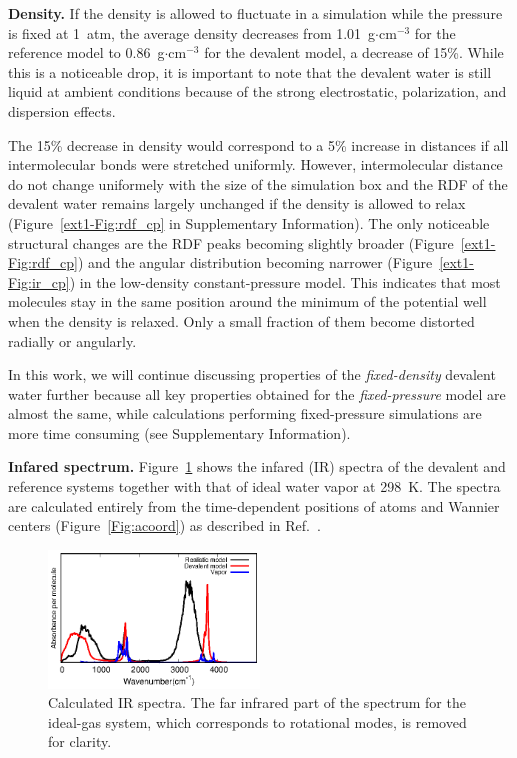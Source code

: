 \documentclass[journal=jacsat,manuscript=article]{achemso}
\begin{document}
\textbf{Density.} If the density is allowed to fluctuate in a simulation while the pressure is fixed at 1~atm, the average density decreases from 1.01~g$\cdot$cm$^{-3}$ for the reference model to 0.86~g$\cdot$cm$^{-3}$ for the devalent model, a decrease of 15\%. 
While this is a noticeable drop, it is important to note that the devalent water is still liquid at ambient conditions because of the strong electrostatic, polarization, and dispersion effects. 

The 15\% decrease in density would correspond to a 5\% increase in distances if all intermolecular bonds were stretched uniformly. 
However, intermolecular distance do not change uniformely with the size of the simulation box and the RDF of the devalent water remains largely unchanged if the density is allowed to relax (Figure~\ref{ext1-Fig:rdf_cp} in Supplementary Information). 
The only noticeable structural changes are the RDF peaks becoming slightly broader (Figure~\ref{ext1-Fig:rdf_cp}) and the angular distribution becoming narrower (Figure~\ref{ext1-Fig:ir_cp}) in the low-density constant-pressure model. 
This indicates that most molecules stay in the same position around the minimum of the potential well when the density is relaxed. 
Only a small fraction of them become distorted radially or angularly. 

In this work, we will continue discussing properties of the \emph{fixed-density} devalent water further because all key properties obtained for the \emph{fixed-pressure} model are almost the same, while calculations performing fixed-pressure simulations are more time consuming (see Supplementary Information).


\textbf{Infared spectrum.} Figure~\ref{Fig:IR} shows the infared (IR) spectra of the devalent and reference systems together with that of ideal water vapor at 298~K. The spectra are calculated entirely from the time-dependent positions of atoms and Wannier centers (Figure~\ref{Fig:acoord}) as described in Ref.~.

\begin{figure}
\centering
\includegraphics[width=0.5\textwidth]{new_ir}
\caption{Calculated IR spectra. The far infrared part of the spectrum for the ideal-gas system, which corresponds to rotational modes, is removed for clarity. 
} \label{Fig:IR}
\end{figure}
\end{document}
